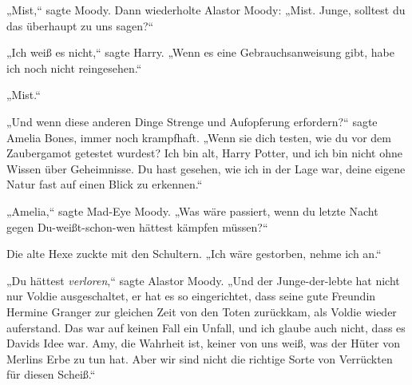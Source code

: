 „Mist,“ sagte Moody. Dann wiederholte Alastor Moody: „Mist. Junge, solltest du das überhaupt zu uns sagen?“

„Ich weiß es nicht,“ sagte Harry. „Wenn es eine Gebrauchsanweisung gibt, habe ich noch nicht reingesehen.“

„Mist.“

„Und wenn diese anderen Dinge Strenge und Aufopferung erfordern?“ sagte Amelia Bones, immer noch krampfhaft. „Wenn sie dich testen, wie du vor dem Zaubergamot getestet wurdest? Ich bin alt, Harry Potter, und ich bin nicht ohne Wissen über Geheimnisse. Du hast gesehen, wie ich in der Lage war, deine eigene Natur fast auf einen Blick zu erkennen.“

„Amelia,“ sagte Mad-Eye Moody. „Was wäre passiert, wenn du letzte Nacht gegen Du-weißt-schon-wen hättest kämpfen müssen?“

Die alte Hexe zuckte mit den Schultern.
„Ich wäre gestorben, nehme ich an.“

„Du hättest \emph{verloren},“ sagte Alastor Moody. „Und der Junge-der-lebte hat nicht nur Voldie ausgeschaltet, er hat es so eingerichtet, dass seine gute Freundin Hermine Granger zur gleichen Zeit von den Toten zurückkam, als Voldie wieder auferstand. Das war auf keinen Fall ein Unfall, und ich glaube auch nicht, dass es Davids Idee war. Amy, die Wahrheit ist, keiner von uns weiß, was der Hüter von Merlins Erbe zu tun hat. Aber wir sind nicht die richtige Sorte von Verrückten für diesen Scheiß.“


